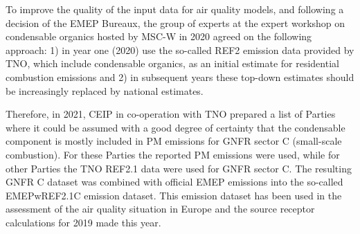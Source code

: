 To improve the quality of the input data for air quality models, and following a decision of the EMEP Bureaux, the group of experts at the expert workshop on condensable organics hosted by MSC-W in 2020 agreed on the following approach: 1) in year one (2020) use the so-called REF2 emission data provided by TNO, which include condensable organics, as an initial estimate for residential combustion emissions and 2) in subsequent years these top-down estimates should be increasingly replaced by national estimates. 

Therefore, in 2021, CEIP in co-operation with TNO prepared a list of Parties where it could be assumed with a good degree of certainty that the condensable component is mostly included in PM emissions for GNFR sector C (small-scale combustion). For these Parties the reported PM emissions were used, while for other Parties the TNO REF2.1 data were used for GNFR sector C. The resulting GNFR C dataset was combined with official EMEP emissions into the so-called EMEPwREF2.1C emission dataset. This emission dataset has been used in the assessment of the air quality situation in Europe and the source receptor calculations for 2019 made this year. 



